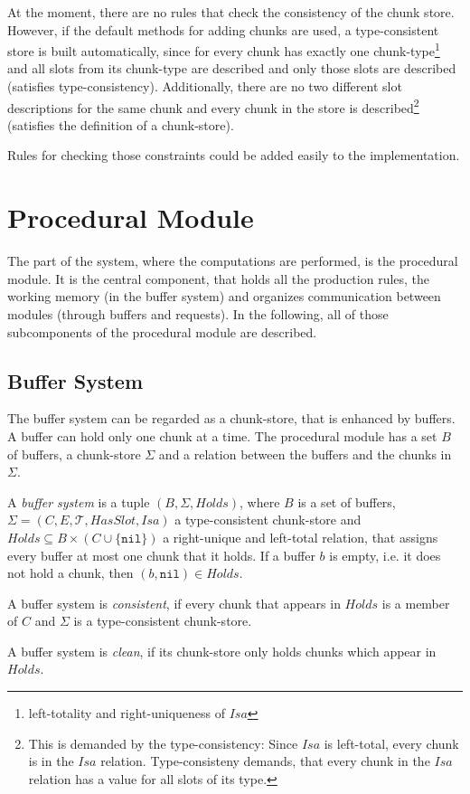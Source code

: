 At the moment, there are no rules that check the consistency of the chunk store. However, if the default methods for adding chunks are used, a type-consistent store is built automatically, since for every chunk has exactly one chunk-type\footnote{left-totality and right-uniqueness of $Isa$} and all slots from its chunk-type are described and only those slots are described (satisfies type-consistency). Additionally, there are no two different slot descriptions for the same chunk and every chunk in the store is described\footnote{This is demanded by the type-consistency: Since $Isa$ is left-total, every chunk is in the $Isa$ relation. Type-consisteny demands, that every chunk in the $Isa$ relation has a value for all slots of its type.} (satisfies the definition of a chunk-store).

Rules for checking those constraints could be added easily to the implementation.

\section{Procedural Module}
\label{implementation:procedural_module}

The part of the system, where the computations are performed, is the procedural module. It is the central component, that holds all the production rules, the working memory (in the buffer system) and organizes communication between modules (through buffers and requests). In the following, all of those subcomponents of the procedural module are described.

\subsection{Buffer System}

The buffer system can be regarded as a chunk-store, that is enhanced by buffers. A buffer can hold only one chunk at a time. The procedural module has a set $B$ of buffers, a chunk-store $\Sigma$ and a relation between the buffers and the chunks in $\Sigma$.

\begin{definition}
\label{def:buffer_system}
A \emph{buffer system} is a tuple $(B,\Sigma,Holds)$, where $B$ is a set of buffers, $\Sigma = (C, E, \mathcal{T}, HasSlot, Isa)$ a type-consistent chunk-store and $Holds \subseteq B \times (C \cup \{ \mathtt{nil} \})$ a right-unique and left-total relation, that assigns every buffer at most one chunk that it holds. If a buffer $b$ is empty, i.e. it does not hold a chunk, then $(b,\mathtt{nil}) \in Holds$.

A buffer system is \emph{consistent}, if every chunk that appears in $Holds$ is a member of $C$ and $\Sigma$ is a type-consistent chunk-store.

A buffer system is \emph{clean}, if its chunk-store only holds chunks which appear in $Holds$.
\end{definition}

